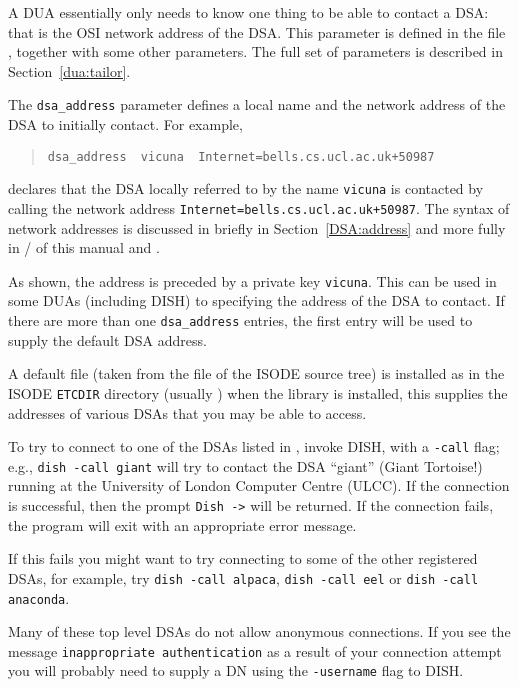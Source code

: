 A DUA essentially only needs to know one thing to be able to contact a
DSA: that is the OSI network address of the DSA.
This parameter is defined in the file , 
together with some other parameters.
The full set of parameters is described in Section~\ref{dua:tailor}.

The \verb"dsa_address" parameter defines a local name and the network 
address of the DSA to 
initially contact. For example,
\begin{quote}\begin{verbatim}
dsa_address  vicuna  Internet=bells.cs.ucl.ac.uk+50987
\end{verbatim}\end{quote}
declares that the DSA locally referred to by the name \verb"vicuna" is 
contacted by calling the network
address \verb"Internet=bells.cs.ucl.ac.uk+50987".
The syntax of network addresses is discussed in
briefly in Section~\ref{DSA:address} and more fully in 
\voltwo/ of this manual 
and \cite{String.Addresses}.

As shown, the address is preceded by a private key \verb"vicuna".  This can
be used in some DUAs (including DISH) to specifying the address of the DSA 
to contact.
If there are more than one \verb"dsa_address" entries, the first
entry will be used to supply the default DSA address.

A default  file 
(taken from the  file of the ISODE source tree) 
is installed as
 in the ISODE \verb"ETCDIR" directory
(usually ) when
the  library is installed, this supplies the addresses
of various DSAs that you
may be able to access.
 
To try to connect to one of the DSAs listed in , 
invoke DISH, with a \verb"-call"
flag; e.g., \verb"dish -call giant" will try to contact the DSA
``giant'' (Giant Tortoise!)
running at the University of London Computer Centre (ULCC).
If the connection is successful, then the prompt \verb"Dish ->" will be returned.
If the connection fails, the
program will exit with an appropriate error
message.

If this fails
you might want to 
try connecting to some of the other registered DSAs,
for example, try \verb"dish -call alpaca", \verb"dish -call eel"
or 
\verb"dish -call anaconda".

Many of these top level DSAs do not allow anonymous connections.  If
you see the 
message \verb+inappropriate authentication+ as a result of your
connection attempt you will probably need
to supply a DN using the \verb+-username+ flag to DISH.

